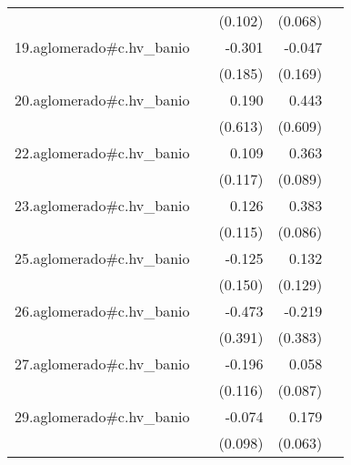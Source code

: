 {\begin{longtable}{l*{4}{D{.}{.}{-1}}}
            &                     &     (0.102)         &     (0.068)         &                     \\
\addlinespace
19.aglomerado#c.hv\_banio&                     &      -0.301         &      -0.047         &                     \\
            &                     &     (0.185)         &     (0.169)         &                     \\
\addlinespace
20.aglomerado#c.hv\_banio&                     &       0.190         &       0.443         &                     \\
            &                     &     (0.613)         &     (0.609)         &                     \\
\addlinespace
22.aglomerado#c.hv\_banio&                     &       0.109         &       0.363\sym{***}&                     \\
            &                     &     (0.117)         &     (0.089)         &                     \\
\addlinespace
23.aglomerado#c.hv\_banio&                     &       0.126         &       0.383\sym{***}&                     \\
            &                     &     (0.115)         &     (0.086)         &                     \\
\addlinespace
25.aglomerado#c.hv\_banio&                     &      -0.125         &       0.132         &                     \\
            &                     &     (0.150)         &     (0.129)         &                     \\
\addlinespace
26.aglomerado#c.hv\_banio&                     &      -0.473         &      -0.219         &                     \\
            &                     &     (0.391)         &     (0.383)         &                     \\
\addlinespace
27.aglomerado#c.hv\_banio&                     &      -0.196         &       0.058         &                     \\
            &                     &     (0.116)         &     (0.087)         &                     \\
\addlinespace
29.aglomerado#c.hv\_banio&                     &      -0.074         &       0.179\sym{**} &                     \\
            &                     &     (0.098)         &     (0.063)         &                     \\

\end{longtable}}

